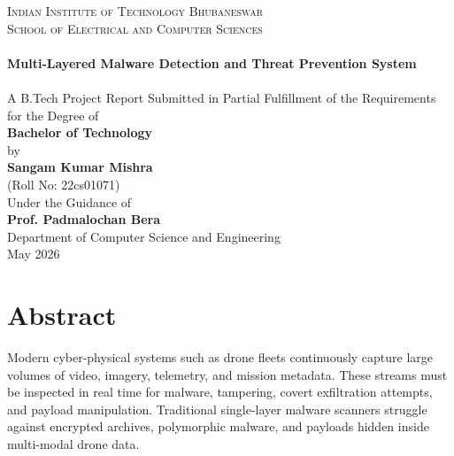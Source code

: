 \documentclass[12pt, a4paper]{report}
\begin{document}
\begin{titlepage}
    \centering
    \vspace*{0.5cm}
    
    \vspace{0.8cm}

    {\large \textsc{Indian Institute of Technology Bhubaneswar}}\\[0.25cm]
    {\large \textsc{School of Electrical and Computer Sciences}}\\[1.2cm]

    \hrulefill\\[0.4cm]
    {\bfseries\LARGE Multi-Layered Malware Detection and Threat Prevention System}\\[0.4cm]
    \hrulefill\\[1.2cm]

    {\small A B.Tech Project Report Submitted in Partial Fulfillment of the Requirements for the Degree of}\\[0.3cm]
    {\large \textbf{Bachelor of Technology}}\\[1.0cm]

    {\small by}\\[0.2cm]
    {\large \textbf{Sangam Kumar Mishra}}\\[0.1cm]
    {\small (Roll No: 22cs01071)}\\[1.2cm]

    {\small Under the Guidance of}\\[0.2cm]
    {\large \textbf{Prof. Padmalochan Bera}}\\[0.1cm]
    {\small Department of Computer Science and Engineering}\\[0.5cm]

    {\large May 2026}\\[0.2cm]

    \vspace*{\fill}
\end{titlepage}

\chapter*{Abstract}
\thispagestyle{plain}

Modern cyber-physical systems such as drone fleets continuously capture large
volumes of video, imagery, telemetry, and mission metadata. These streams must
be inspected in real time for malware, tampering, covert exfiltration attempts,
and payload manipulation. Traditional single-layer malware scanners struggle
against encrypted archives, polymorphic malware, and payloads hidden inside
multi-modal drone data.
\end{document}
